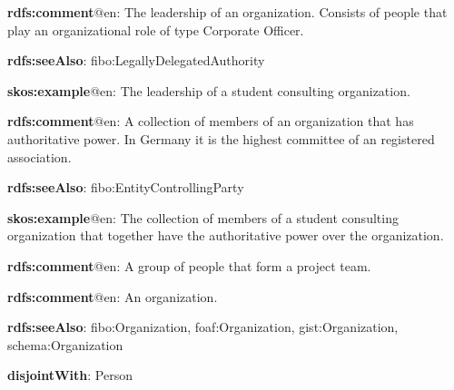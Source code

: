 \documentclass[a4paper, DIV=13, BCOR=0cm]{scrbook}
\begin{document}
\begin{mdframed}[style=onto-2, frametitle={Executive Board}]
	{%
		\begin{compactitem}
			\item \textbf{rdfs:comment}@en: The leadership of an organization. Consists of people that play an organizational role of type Corporate Officer.
			\item \textbf{rdfs:seeAlso}: fibo:LegallyDelegatedAuthority
			\item \textbf{skos:example}@en: The leadership of a student consulting organization.
		\end{compactitem}
	} %
\end{mdframed}

\begin{mdframed}[style=onto-2, frametitle={Member Assembly}]
	{%
		\begin{compactitem}
			\item \textbf{rdfs:comment}@en: A collection of members of an organization that has authoritative power. In Germany it is the highest committee of an registered association.
			\item \textbf{rdfs:seeAlso}: fibo:EntityControllingParty
			\item \textbf{skos:example}@en: The collection of members of a student consulting organization that together have the authoritative power over the organization.
		\end{compactitem}
	} %
\end{mdframed}

\begin{mdframed}[style=onto-2, frametitle={Project Team}]
	{%
		\begin{compactitem}
			\item \textbf{rdfs:comment}@en: A group of people that form a project team.
		\end{compactitem}
	} %
\end{mdframed}

\begin{mdframed}[style=onto-1, frametitle={Organization}]
	{%
		\begin{compactitem}
			\item \textbf{rdfs:comment}@en: An organization.
			\item \textbf{rdfs:seeAlso}: fibo:Organization, foaf:Organization, 
			gist:Organization, \\ schema:Organization
			\item \textbf{disjointWith}: Person
		\end{compactitem}
	} %
\end{mdframed}
\end{document}
